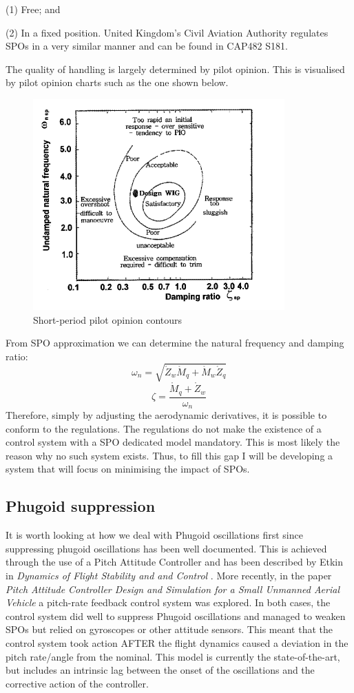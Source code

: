 \documentclass[
11pt, %
english, %
onehalfspacex, %
headsepline, %
] %
{MastersDoctoralThesis}
\begin{document}
(1) Free; and

(2) In a fixed position.
\newline
United Kingdom's Civil Aviation Authority regulates SPOs in a very similar manner and can be found in CAP482 S181. 

The quality of handling is largely determined by pilot opinion. This is visualised by pilot opinion charts such as the one shown below. 
\begin{figure}[h]
\centering
\includegraphics[scale=1]{contour.png}
\caption{Short-period pilot opinion contours \cite{chung}}
\centering
\end{figure}

From SPO approximation \cite{short} we can determine the natural frequency and damping ratio:
$$\omega_{n}=\sqrt{\mathring{Z}_{w}\mathring{M}_{q}+\mathring{M}_{w}\mathring{Z}_{q}}$$
$$\zeta = \frac{\mathring{M}_{q}+\mathring{Z}_{w}}{\omega_{n}}$$
Therefore, simply by adjusting the aerodynamic derivatives, it is possible to conform to the regulations. The regulations do not make the existence of a control system with a SPO dedicated model mandatory. This is most likely the reason why no such system exists. Thus, to fill this gap I will be developing a system that will focus on minimising the impact of SPOs.  
\thispagestyle{fancy}
\subsection{Phugoid suppression}
It is worth looking at how we deal with Phugoid oscillations first since suppressing phugoid oscillations has been well documented. This is achieved through the use of a Pitch Attitude Controller and has been described by Etkin in \textit{Dynamics of Flight Stability and and Control} \cite{etkin}. More recently, in the paper \textit{Pitch Attitude Controller Design and Simulation for a Small Unmanned Aerial Vehicle} \cite{huang} a pitch-rate feedback control system was explored. In both cases, the control system did well to suppress Phugoid oscillations and managed to weaken SPOs but relied on gyroscopes or other attitude sensors. This meant that the control system took action AFTER the flight dynamics caused a deviation in the pitch rate/angle from the nominal. This model is currently the state-of-the-art, but includes an intrinsic lag between the onset of the oscillations and the corrective action of the controller.  
\end{document}
